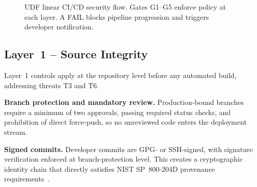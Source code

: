 \documentclass[letterpaper, 10pt, conference]{ieeeconf}
\begin{document}
\begin{figure}[t]
{
}
\caption{UDF linear CI/CD security flow. Gates G1--G5 enforce
  policy at each layer. A FAIL blocks pipeline progression and
  triggers developer notification.}
\label{fig:pipeline}
\end{figure}

\subsection{Layer~1 -- Source Integrity}

Layer~1 controls apply at the repository level before any automated
build, addressing threats T3 and T6.

\textbf{Branch protection and mandatory review.} Production-bound
branches require a minimum of two approvals, passing required status
checks, and prohibition of direct force-push, so no unreviewed code
enters the deployment stream.

\textbf{Signed commits.} Developer commits are GPG- or SSH-signed, with
signature verification enforced at branch-protection level. This creates
a cryptographic identity chain that directly satisfies NIST SP~800-204D
provenance requirements~\cite{nist2024}.
\end{document}
